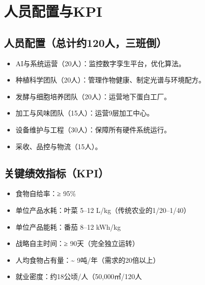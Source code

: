 \section{人员配置与KPI}\label{ux4ebaux5458ux914dux7f6eux4e0ekpi}

\subsection{人员配置（总计约120人，三班倒）}\label{ux4ebaux5458ux914dux7f6eux603bux8ba1ux7ea6120ux4ebaux4e09ux73edux5012}

\begin{itemize}
\item
  AI与系统运营（20人）：监控数字孪生平台，优化算法。
\item
  种植科学团队（20人）：管理作物健康、制定光谱与环境配方。
\item
  发酵与细胞培养团队（20人）：运营地下蛋白工厂。
\item
  加工与风味团队（15人）：运营9层加工中心。
\item
  设备维护与工程（30人）：保障所有硬件系统运行。
\item
  采收、品控与物流（15人）。
\end{itemize}

\subsection{关键绩效指标（KPI）}\label{ux5173ux952eux7ee9ux6548ux6307ux6807kpi}

\begin{itemize}
\item
  食物自给率：≥ 95\%
\item
  单位产品水耗：叶菜 5--12 L/kg（传统农业的1/20--1/40）
\item
  单位产品能耗：番茄 8--12 kWh/kg
\item
  战略自主时间：≥ 90天（完全独立运转）
\item
  人均食物占有量：\textasciitilde{} 9吨/年（需求的20倍以上）
\item
  就业密度：约18公顷/人（50,000㎡/120人
\end{itemize}
